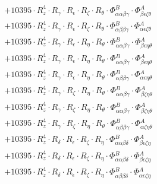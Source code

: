 \documentclass{article}
\begin{document}
\begin{subequations}
\begin{gather}
\begin{array}{c}
 \\[0.2em] 		 + 10395 \cdot R_{z}^{4} \cdot R_{\gamma{}} \cdot R_{\epsilon{}} \cdot R_{\zeta{}} \cdot R_{\theta{}} \cdot \Phi{}^{B}_{\alpha{}\alpha{}\beta{}\gamma{}} \cdot \Phi{}^{A}_{\beta{}\epsilon{}\zeta{}\theta{}} 
 \\[0.2em] 		 + 10395 \cdot R_{z}^{4} \cdot R_{\gamma{}} \cdot R_{\epsilon{}} \cdot R_{\zeta{}} \cdot R_{\theta{}} \cdot \Phi{}^{B}_{\alpha{}\beta{}\beta{}\gamma{}} \cdot \Phi{}^{A}_{\alpha{}\epsilon{}\zeta{}\theta{}} 
 \\[0.2em] 		 + 10395 \cdot R_{z}^{4} \cdot R_{\gamma{}} \cdot R_{\epsilon{}} \cdot R_{\eta{}} \cdot R_{\theta{}} \cdot \Phi{}^{B}_{\alpha{}\alpha{}\beta{}\gamma{}} \cdot \Phi{}^{A}_{\beta{}\epsilon{}\eta{}\theta{}} 
 \\[0.2em] 		 + 10395 \cdot R_{z}^{4} \cdot R_{\gamma{}} \cdot R_{\epsilon{}} \cdot R_{\eta{}} \cdot R_{\theta{}} \cdot \Phi{}^{B}_{\alpha{}\alpha{}\beta{}\gamma{}} \cdot \Phi{}^{A}_{\beta{}\epsilon{}\eta{}\theta{}} 
 \\[0.2em] 		 + 10395 \cdot R_{z}^{4} \cdot R_{\gamma{}} \cdot R_{\epsilon{}} \cdot R_{\eta{}} \cdot R_{\theta{}} \cdot \Phi{}^{B}_{\alpha{}\beta{}\beta{}\gamma{}} \cdot \Phi{}^{A}_{\alpha{}\epsilon{}\eta{}\theta{}} 
 \\[0.2em] 		 + 10395 \cdot R_{z}^{4} \cdot R_{\gamma{}} \cdot R_{\zeta{}} \cdot R_{\eta{}} \cdot R_{\theta{}} \cdot \Phi{}^{B}_{\alpha{}\alpha{}\beta{}\gamma{}} \cdot \Phi{}^{A}_{\beta{}\zeta{}\eta{}\theta{}} 
 \\[0.2em] 		 + 10395 \cdot R_{z}^{4} \cdot R_{\gamma{}} \cdot R_{\zeta{}} \cdot R_{\eta{}} \cdot R_{\theta{}} \cdot \Phi{}^{B}_{\alpha{}\alpha{}\beta{}\gamma{}} \cdot \Phi{}^{A}_{\beta{}\zeta{}\eta{}\theta{}} 
 \\[0.2em] 		 + 10395 \cdot R_{z}^{4} \cdot R_{\gamma{}} \cdot R_{\zeta{}} \cdot R_{\eta{}} \cdot R_{\theta{}} \cdot \Phi{}^{B}_{\alpha{}\beta{}\beta{}\gamma{}} \cdot \Phi{}^{A}_{\alpha{}\zeta{}\eta{}\theta{}} 
 \\[0.2em] 		 + 10395 \cdot R_{z}^{4} \cdot R_{\delta{}} \cdot R_{\epsilon{}} \cdot R_{\zeta{}} \cdot R_{\eta{}} \cdot \Phi{}^{B}_{\alpha{}\alpha{}\beta{}\delta{}} \cdot \Phi{}^{A}_{\beta{}\epsilon{}\zeta{}\eta{}} 
 \\[0.2em] 		 + 10395 \cdot R_{z}^{4} \cdot R_{\delta{}} \cdot R_{\epsilon{}} \cdot R_{\zeta{}} \cdot R_{\eta{}} \cdot \Phi{}^{B}_{\alpha{}\alpha{}\beta{}\delta{}} \cdot \Phi{}^{A}_{\beta{}\epsilon{}\zeta{}\eta{}} 
 \\[0.2em] 		 + 10395 \cdot R_{z}^{4} \cdot R_{\delta{}} \cdot R_{\epsilon{}} \cdot R_{\zeta{}} \cdot R_{\eta{}} \cdot \Phi{}^{B}_{\alpha{}\beta{}\beta{}\delta{}} \cdot \Phi{}^{A}_{\alpha{}\epsilon{}\zeta{}\eta{}} 

\end{array}
\end{gather}
\end{subequations}
\end{document}
